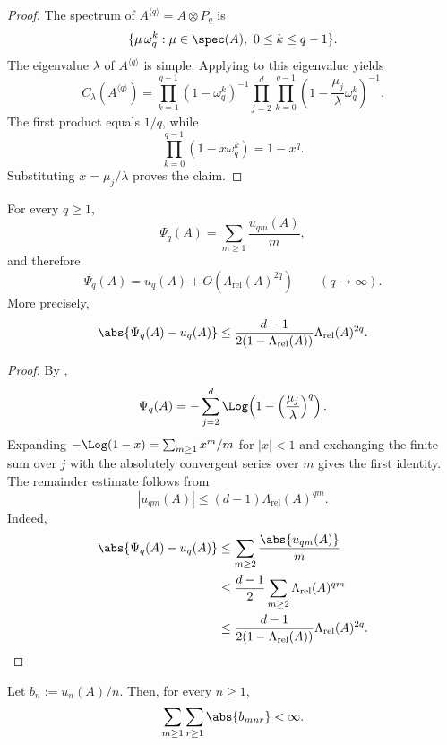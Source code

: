 \begin{proof}
  The spectrum of \(A^{\langle q\rangle}=A\otimes P_q\) is
  \[
    \{\mu\,\omega_q^k:\mu\in\spec(A),\ 0\le k\le q-1\}.
  \]
  The eigenvalue \(\lambda\) of \(A^{\langle q\rangle}\) is simple.
  Applying  to this
  eigenvalue yields
  \[
    C_\lambda(A^{\langle q\rangle})
    =\prod_{k=1}^{q-1}(1-\omega_q^k)^{-1}
      \prod_{j=2}^d\prod_{k=0}^{q-1}
        \left(1-\frac{\mu_j}{\lambda}\omega_q^k\right)^{-1}.
  \]
  The first product equals \(1/q\), while
  \[
    \prod_{k=0}^{q-1}(1-x\omega_q^k)=1-x^q.
  \]
  Substituting \(x=\mu_j/\lambda\) proves the claim.
\end{proof}

\begin{proposition}
  \label{prop:finite-part-cyclic-lift-dirichlet-multiple-sum}
  For every \(q\ge 1\),
  \[
    \Psi_q(A)=\sum_{m\ge 1}\frac{u_{qm}(A)}{m},
  \]
  and therefore
  \[
    \Psi_q(A)=u_q(A)+O\!\left(\Lambda_{\mathrm{rel}}(A)^{2q}\right)
    \qquad (q\to\infty).
  \]
  More precisely,
  \[
    \abs{\Psi_q(A)-u_q(A)}
    \le
    \frac{d-1}{2(1-\Lambda_{\mathrm{rel}}(A))}
    \Lambda_{\mathrm{rel}}(A)^{2q}.
  \]
\end{proposition}

\begin{proof}
  By ,
  \[
    \Psi_q(A)
    =-\sum_{j=2}^d\Log\!\left(1-\left(\frac{\mu_j}{\lambda}\right)^q\right).
  \]
  Expanding \(-\Log(1-x)=\sum_{m\ge 1}x^m/m\) for \(|x|<1\) and
  exchanging the finite sum over \(j\) with the absolutely convergent
  series over \(m\) gives the first identity. The remainder estimate
  follows from
  \[
    |u_{qm}(A)|\le (d-1)\Lambda_{\mathrm{rel}}(A)^{qm}.
  \]
  Indeed,
  \[
    \begin{aligned}
      \abs{\Psi_q(A)-u_q(A)}
      &\le
      \sum_{m\ge 2}\frac{\abs{u_{qm}(A)}}{m} \\
      &\le
      \frac{d-1}{2}\sum_{m\ge 2}\Lambda_{\mathrm{rel}}(A)^{qm} \\
      &\le
      \frac{d-1}{2(1-\Lambda_{\mathrm{rel}}(A))}
      \Lambda_{\mathrm{rel}}(A)^{2q}.
    \end{aligned}
  \]
\end{proof}

\begin{lemma}
  \label{lem:finite-part-cyclic-lift-mobius-absolute}
  Let \(b_n:=u_n(A)/n\). Then, for every \(n\ge 1\),
  \[
    \sum_{m\ge 1}\sum_{r\ge 1}\abs{b_{mnr}}<\infty.
  \]
\end{lemma}

